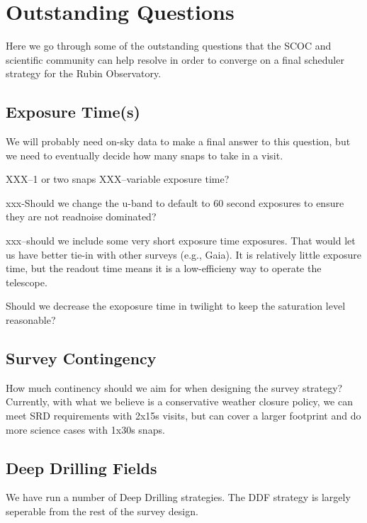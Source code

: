 
\section{Outstanding Questions}\label{sec:questions}

Here we go through some of the outstanding questions that the SCOC and scientific community can help resolve in order to converge on a final scheduler strategy for the Rubin Observatory. 

\subsection{Exposure Time(s)}

We will probably need on-sky data to make a final answer to this question, but we need to eventually decide how many snaps to take in a visit.

XXX--1 or two snaps
XXX--variable exposure time?

xxx-Should we change the u-band to default to 60 second exposures to ensure they are not readnoise dominated? 

xxx--should we include some very short exposure time exposures. That would let us have better tie-in with other surveys (e.g., Gaia).  It is relatively little exposure time, but the readout time means it is a low-efficieny way to operate the telescope.

Should we decrease the exoposure time in twilight to keep the saturation level reasonable?

\subsection{Survey Contingency}

How much continency should we aim for when designing the survey strategy?  Currently, with what we believe is a conservative weather closure policy, we can meet SRD requirements with 2x15s visits, but can cover a larger footprint and do more science cases with 1x30s snaps.  

\subsection{Deep Drilling Fields}

We have run a number of Deep Drilling strategies. The DDF strategy is largely seperable from the rest of the survey design.

